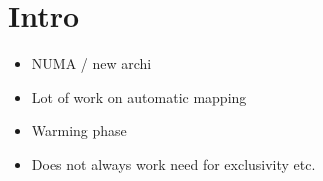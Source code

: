 \section{Intro}
\label{sec:intro}

\begin{itemize}
    \item NUMA / new archi
    \item Lot of work on automatic mapping
    \item Warming phase
    \item Does not always work need for exclusivity etc.
\end{itemize}

